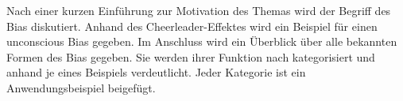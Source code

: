 Nach einer kurzen Einführung zur Motivation des Themas wird der Begriff des Bias diskutiert. Anhand des Cheerleader-Effektes wird ein Beispiel für einen unconscious Bias gegeben. Im Anschluss wird ein Überblick über alle bekannten Formen des Bias gegeben. Sie werden ihrer Funktion nach kategorisiert und anhand je eines Beispiels verdeutlicht. Jeder Kategorie ist ein Anwendungsbeispiel beigefügt.